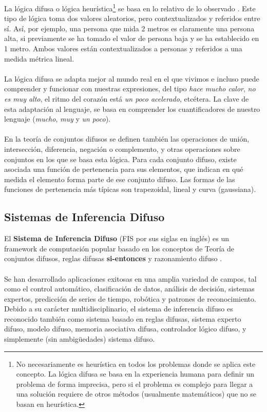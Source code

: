 \documentclass[12pt,letterpaper,oneside] {memoir}
\begin{document}
La lógica difusa o lógica heurística\footnote{No necesariamente es heurística en todos los problemas donde se aplica este concepto. La lógica difusa se basa en la experiencia humana para definir un problema de forma imprecisa, pero si el problema es complejo para llegar a una solución requiere de otros métodos (usualmente matemáticos) que no se basan en heurística.} se basa en lo relativo de lo observado \citep{wikipedia2}. Este tipo de lógica toma dos valores aleatorios, pero contextualizados y referidos entre sí. Así, por ejemplo, una persona que mida 2 metros es claramente una persona alta, si previamente se ha tomado el valor de persona baja y se ha establecido en 1 metro. Ambos valores están contextualizados a personas y referidos a una medida métrica lineal.
\paragraph{}
La lógica difusa se adapta mejor al mundo real en el que vivimos e incluso puede comprender y funcionar con nuestras expresiones, del tipo \textit{hace mucho calor}, \textit{no es muy alto}, el ritmo del corazón está \textit{un poco acelerado}, etcétera. La clave de esta adaptación al lenguaje, se basa en comprender los cuantificadores de nuestro lenguaje (\textit{mucho}, \textit{muy} y  \textit{un poco}).
\paragraph{}
En la teoría de conjuntos difusos se definen también las operaciones de unión, intersección, diferencia, negación o complemento, y otras operaciones sobre conjuntos en los que se basa esta lógica.
Para cada conjunto difuso, existe asociada una función de pertenencia para sus elementos, que indican en qué medida el elemento forma parte de ese conjunto difuso. Las formas de las funciones de pertenencia más típicas son trapezoidal, lineal y curva (gaussiana).

\subsection{Sistemas de Inferencia Difuso}

El \textbf{Sistema de Inferencia Difuso} (FIS por sus siglas en inglés) es un framework de computación popular basado en los conceptos de Teoría de conjuntos difusos, reglas difusas \textbf{si-entonces} y razonamiento difuso \citep{Jang1997}.
\paragraph{}
Se han desarrollado aplicaciones exitosas en una amplia  variedad de campos, tal como el control automático, clasificación de datos, análisis de decisión, sistemas expertos, predicción de series de tiempo, robótica y patrones de reconocimiento. 
Debido a su carácter multidisciplinario, el  sistema de inferencia difuso es reconocido también como sistema basado en reglas difusas, sistema experto difuso, modelo difuso, memoria asociativa difusa, controlador lógico difuso, y simplemente (sin ambigüedades) sistema difuso.
\end{document}
